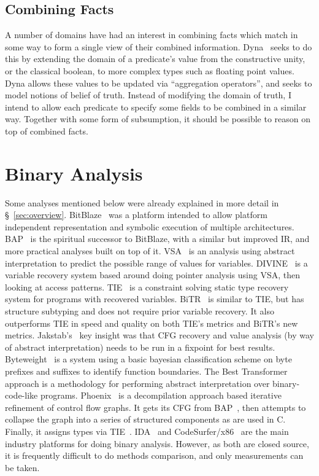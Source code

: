 \subsection{Combining Facts}
A number of domains have had an interest in combining facts which match in some way to form a single view of their combined information.
Dyna~\cite{dyna} seeks to do this by extending the domain of a predicate's value from the constructive unity, or the classical boolean, to more complex types such as floating point values.
Dyna allows these values to be updated via ``aggregation operators'', and seeks to model notions of belief of truth.
Instead of modifying the domain of truth, I intend to allow each predicate to specify some fields to be combined in a similar way.
Together with some form of subsumption, it should be possible to reason on top of combined facts.

\section{Binary Analysis}
Some analyses mentioned below were already explained in more detail in \S~\ref{sec:overview}.
BitBlaze~\cite{bitblaze} was a platform intended to allow platform independent representation and symbolic execution of multiple architectures.
BAP~\cite{bap} is the spiritual successor to BitBlaze, with a similar but improved IR, and more practical analyses built on top of it.
VSA~\cite{vsa} is an analysis using abstract interpretation to predict the possible range of values for variables.
DIVINE~\cite{divine} is a variable recovery system based around doing pointer analysis using VSA, then looking at access patterns.
TIE~\cite{tie} is a constraint solving static type recovery system for programs with recovered variables.
BiTR~\cite{bitr} is similar to TIE, but has structure subtyping and does not require prior variable recovery. It also outperforms TIE in speed and quality on both TIE's metrics and BiTR's new metrics.
Jakstab's~\cite{jakstab} key insight was that CFG recovery and value analysis (by way of abstract interpretation) needs to be run in a fixpoint for best results.
Byteweight~\cite{byteweight} is a system using a basic bayesian classification scheme on byte prefixes and suffixes to identify function boundaries.
The Best Transformer~\cite{besttransformer} approach is a methodology for performing abstract interpretation over binary-code-like programs.
Phoenix~\cite{phoenix} is a decompilation approach based iterative refinement of control flow graphs. It gets its CFG from BAP~\cite{bap}, then attempts to collapse the graph into a series of structured components as are used in C. Finally, it assigns types via TIE~\cite{tie}.
IDA~\cite{ida} and CodeSurfer/x86~\cite{codesurfer} are the main industry platforms for doing binary analysis. However, as both are closed source, it is frequently difficult to do methods comparison, and only measurements can be taken.


